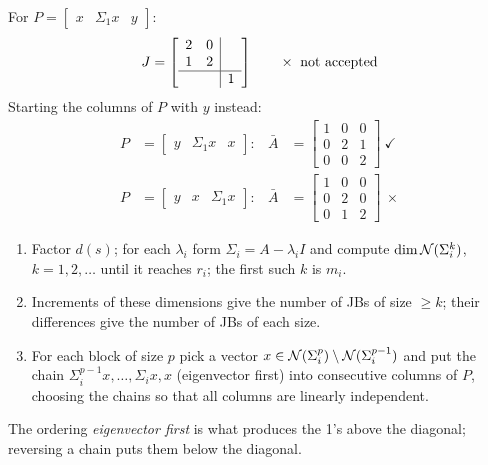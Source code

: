 \begin{example}
For $P=\left[\begin{array}{cc|c}x&\Sigma_1x&y\end{array}\right]$:
\[
J=\left[\begin{array}{cc|c}2&0&\\1&2&\\\hline &&1\end{array}\right]
\qquad \times\ \text{not accepted}
\]
Starting the columns of $P$ with $y$ instead:
\begin{align*}
P&=\left[\begin{array}{c|cc}y&\Sigma_1x&x\end{array}\right]: &
\bar A&=\left[\begin{array}{c|cc}1&0&0\\\hline 0&2&1\\0&0&2\end{array}\right]\ \checkmark\\[4pt]
P&=\left[\begin{array}{c|cc}y&x&\Sigma_1x\end{array}\right]: &
\bar A&=\left[\begin{array}{c|cc}1&0&0\\\hline 0&2&0\\0&1&2\end{array}\right]\ \times
\end{align*}

\begin{insight}
\begin{enumerate}[nosep]
\item Factor $d(s)$; for each $\lambda_i$ form $\Sigma_i=A-\lambda_iI$ and compute $\dim\mathcal{N}(\Sigma_i^k)$, $k=1,2,\dots$ until it reaches $r_i$; the first such $k$ is $m_i$.
\item Increments of these dimensions give the number of JBs of size $\geq k$; their differences give the number of JBs of each size.
\item For each block of size $p$ pick a vector $x\in\mathcal{N}(\Sigma_i^{p})\setminus\mathcal{N}(\Sigma_i^{p-1})$ and put the chain $\Sigma_i^{p-1}x,\dots,\Sigma_ix,x$ (eigenvector first) into consecutive columns of $P$, choosing the chains so that all columns are linearly independent.
\end{enumerate}
The ordering \emph{eigenvector first} is what produces the 1's above the diagonal; reversing a chain puts them below the diagonal.
\end{insight}
\end{example}

